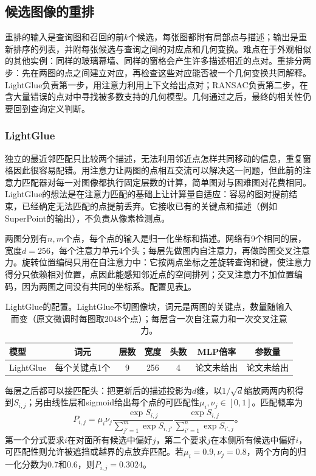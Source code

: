 \subsection{候选图像的重排}
\label{sec:vision-recognition-verification}

重排的输入是查询图和召回的前$k$个候选，每张图都附有局部点与描述；输出是重新排序的列表，并附每张候选与查询之间的对应点和几何变换。难点在于外观相似的其他实例：同样的玻璃幕墙、同样的窗格会产生许多描述相近的点对。重排分两步：先在两图的点之间建立对应，再检查这些对应能否被一个几何变换共同解释。LightGlue负责第一步，用注意力利用上下文给出点对；RANSAC负责第二步，在含大量错误的点对中寻找被多数支持的几何模型。几何通过之后，最终的相关性仍要回到查询定义判断。

\subsubsection{LightGlue}
\label{sec:vision-recognition-lightglue}

独立的最近邻匹配只比较两个描述，无法利用邻近点怎样共同移动的信息，重复窗格因此很容易配错。用注意力让两图的点相互交流可以解决这一问题，但此前的注意力匹配器对每一对图像都执行固定层数的计算，简单图对与困难图对花费相同。LightGlue的想法是在注意力匹配的基础上让计算量自适应：容易的图对提前结束，已经确定无法匹配的点提前丢弃。它接收已有的关键点和描述（例如SuperPoint的输出），不负责从像素检测点。

两图分别有$n,m$个点，每个点的输入是归一化坐标和描述。网络有9个相同的层，宽度$d=256$，每个注意力单元4个头；每层先做图内自注意力，再做跨图交叉注意力。旋转位置编码只用在自注意力中：它按两点坐标之差旋转查询和键，使注意力得分只依赖相对位置，点因此能感知邻近点的空间排列；交叉注意力不加位置编码，因为两图之间没有共同的坐标系。配置见表\ref{tab:vision-recognition-lightglue-config}。

\begin{table}[htbp]
 \centering
 \small
 \begin{tabular}{@{}lcccccc@{}}
 \toprule
 模型 & 词元 & 层数 & 宽度 & 头数 & MLP倍率 & 参数量\\
 \midrule
 LightGlue & 每个关键点1个 & 9 & 256 & 4 & 论文未给出 & 论文未给出\\
 \bottomrule
 \end{tabular}
 \caption{LightGlue的配置。LightGlue不切图像块，词元是两图的关键点，数量随输入而变（原文微调时每图取2048个点）；每层含一次自注意力和一次交叉注意力。}
 \label{tab:vision-recognition-lightglue-config}
\end{table}每层之后都可以接匹配头：把更新后的描述投影为$d$维，以$1/\sqrt d$缩放两两内积得到$S_{i,j}$；另由线性层和sigmoid给出每个点的可匹配性$\mu_i,\nu_j\in[0,1]$。匹配概率为
\begin{equation}
 P_{i,j}=\mu_i\nu_j
 \frac{\exp S_{i,j}}{\sum_{j'=1}^{m}\exp S_{i,j'}}
 \frac{\exp S_{i,j}}{\sum_{i'=1}^{n}\exp S_{i',j}}\text{。}
 \label{eq:vision-lightglue-score}
\end{equation}
第一个分式要求$i$在对面所有候选中偏好$j$，第二个要求$j$在本侧所有候选中偏好$i$，可匹配性则允许被遮挡或越界的点放弃匹配。若$\mu_i=0.9,\nu_j=0.8$，两个方向的归一化分数为0.7和0.6，则$P_{i,j}=0.3024$。

